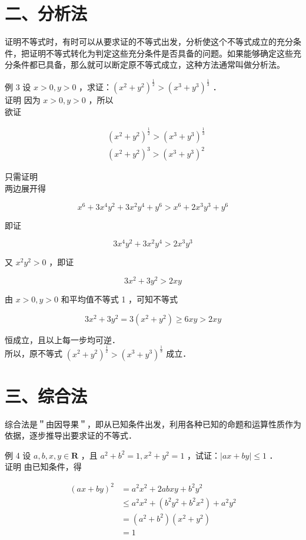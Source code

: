 \documentclass[10pt]{article}
\begin{document}
\section*{二、分析法}
证明不等式时，有时可以从要求证的不等式出发，分析使这个不等式成立的充分条件，把证明不等式转化为判定这些充分条件是否具备的问题。如果能够确定这些充分条件都已具备，那么就可以断定原不等式成立，这种方法通常叫做分析法。

例 3 设 \(x>0, y>0\) ，求证：\(\left(x^{2}+y^{2}\right)^{\frac{1}{2}}>\left(x^{3}+y^{3}\right)^{\frac{1}{3}}\) ．\\
证明 因为 \(x>0, y>0\) ，所以\\
欲证

\[
\begin{aligned}
& \left(x^{2}+y^{2}\right)^{\frac{1}{2}}>\left(x^{3}+y^{3}\right)^{\frac{1}{3}} \\
& \left(x^{2}+y^{2}\right)^{3}>\left(x^{3}+y^{3}\right)^{2}
\end{aligned}
\]

只需证明\\
两边展开得

\[
x^{6}+3 x^{4} y^{2}+3 x^{2} y^{4}+y^{6}>x^{6}+2 x^{3} y^{3}+y^{6}
\]

即证

\[
3 x^{4} y^{2}+3 x^{2} y^{4}>2 x^{3} y^{3}
\]

又 \(x^{2} y^{2}>0\) ，即证

\[
3 x^{2}+3 y^{2}>2 x y
\]

由 \(x>0, y>0\) 和平均值不等式 1 ，可知不等式

\[
3 x^{2}+3 y^{2}=3\left(x^{2}+y^{2}\right) \geqslant 6 x y>2 x y
\]

恒成立，且以上每一步均可逆．\\
所以，原不等式 \(\left(x^{2}+y^{2}\right)^{\frac{1}{2}}>\left(x^{3}+y^{3}\right)^{\frac{1}{3}}\) 成立．

\section*{三、综合法}
综合法是＂由因导果＂，即从已知条件出发，利用各种已知的命题和运算性质作为依据，逐步推导出要求证的不等式．

例 4 设 \(a, b, x, y \in \mathbf{R}\) ，且 \(a^{2}+b^{2}=1, x^{2}+y^{2}=1\) ，试证：\(|a x+b y| \leqslant 1\) ．\\
证明 由已知条件，得

\[
\begin{aligned}
(a x+b y)^{2} & =a^{2} x^{2}+2 a b x y+b^{2} y^{2} \\
& \leqslant a^{2} x^{2}+\left(b^{2} y^{2}+b^{2} x^{2}\right)+a^{2} y^{2} \\
& =\left(a^{2}+b^{2}\right)\left(x^{2}+y^{2}\right) \\
& =1
\end{aligned}
\]
\end{document}
